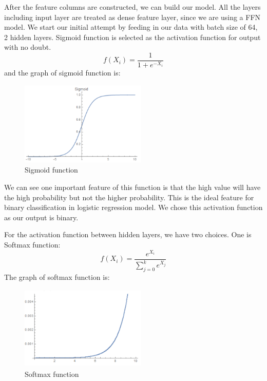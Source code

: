 \documentclass{article}
\begin{document}
After the feature columns are constructed, we can build our model. All the layers including input layer are treated as dense feature layer, since we are using a FFN model. We start our initial attempt by feeding in our data with batch size of 64, 2 hidden layers. Sigmoid function is selected as the activation function for output with no doubt. 
\begin{equation}
f(X_i)=\frac{1}{1+e^{-X_i}}
\end{equation}  and the graph of sigmoid function is:
\begin{figure}[h]
 \centering
 \includegraphics[width=6cm, height=4cm]{sigmoid.png}
 \caption{Sigmoid function}
\end{figure}

We can see one important feature of this function is that the high value will have the high probability but not the higher probability. This is the ideal feature for binary classification in logistic regression model. We chose this activation function as our output is binary.

For the activation function between hidden layers, we have two choices. One is Softmax function: 
\begin{equation}
f(X_i)=\frac{e^{X_i}}{\sum_{j=0}^{k}e^{X_j}}
\end{equation}
The graph of softmax function is:
\begin{figure}[h]
 \centering
 \includegraphics[width=6cm, height=4cm]{softmax.png}
 \caption{Softmax function}
\end{figure}
\end{document}
